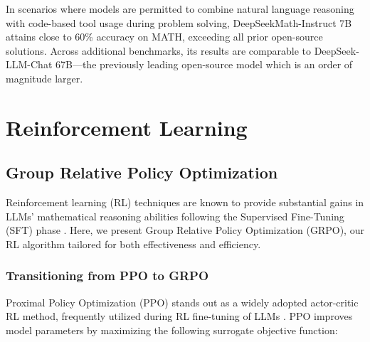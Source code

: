 In scenarios where models are permitted to combine natural language reasoning with code-based tool usage during problem solving, DeepSeekMath-Instruct 7B attains close to 60\% accuracy on MATH, exceeding all prior open-source solutions. Across additional benchmarks, its results are comparable to DeepSeek-LLM-Chat 67B—the previously leading open-source model which is an order of magnitude larger.

\section{Reinforcement Learning}

\subsection{Group Relative Policy Optimization}
Reinforcement learning (RL) techniques are known to provide substantial gains in LLMs' mathematical reasoning abilities following the Supervised Fine-Tuning (SFT) phase \citep{wang2023math,wizardmath}. Here, we present Group Relative Policy Optimization (GRPO), our RL algorithm tailored for both effectiveness and efficiency.

\subsubsection{Transitioning from PPO to GRPO}
Proximal Policy Optimization (PPO) \citep{schulman2017proximal} stands out as a widely adopted actor-critic RL method, frequently utilized during RL fine-tuning of LLMs \citep{ouyang2022training}. PPO improves model parameters by maximizing the following surrogate objective function:

